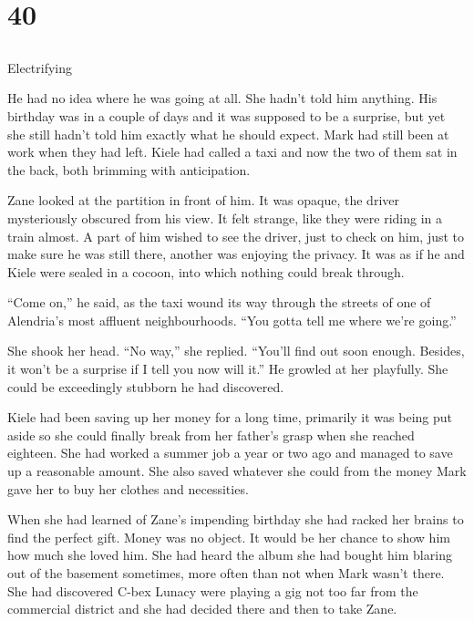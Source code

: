\chapter{40}
\section{}
Electrifying  

He had no idea where he was going at all.  She hadn't told him anything.  His birthday was in a couple of days and it was supposed to be a surprise, but yet she still hadn't told him exactly what he should expect.  Mark had still been at work when they had left.  Kiele had called a taxi and now the two of them sat in the back, both brimming with anticipation.  

Zane looked at the partition in front of him.  It was opaque, the driver mysteriously obscured from his view.  It felt strange, like they were riding in a train almost.  A part of him wished to see the driver, just to check on him, just to make sure he was still there, another was enjoying the privacy.  It was as if he and Kiele were sealed in a cocoon, into which nothing could break through.  

``Come on,'' he said, as the taxi wound its way through the streets of one of Alendria's most affluent neighbourhoods.  ``You gotta tell me where we're going.''

She shook her head.  ``No way,'' she replied.  ``You'll find out soon enough.  Besides, it won't be a surprise if I tell you now will it.''  He growled at her playfully.  She could be exceedingly stubborn he had discovered.  

Kiele had been saving up her money for a long time, primarily it was being put aside so she could finally break from her father's grasp when she reached eighteen.  She had worked a summer job a year or two ago and managed to save up a reasonable amount.  She also saved whatever she could from the money Mark gave her to buy her clothes and necessities.

When she had learned of Zane's impending birthday she had racked her brains to find the perfect gift.  Money was no object.  It would be her chance to show him how much she loved him.  She had heard the album she had bought him blaring out of the basement sometimes, more often than not when Mark wasn't there.  She had discovered C-bex Lunacy were playing a gig not too far from the commercial district and she had decided there and then to take Zane.  

